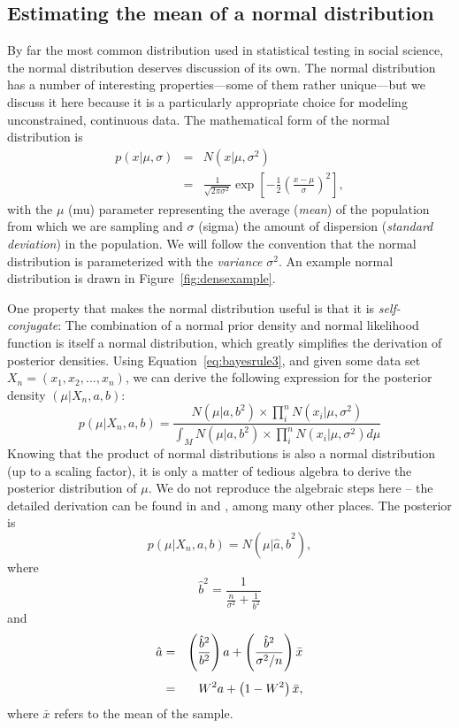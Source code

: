 \subsection*{Estimating the mean of a normal distribution}
By far the most common distribution used in statistical testing in social science, the normal distribution deserves discussion of its own. The normal distribution has a number of interesting properties---some of them rather unique---but we discuss it here because it is a particularly appropriate choice for modeling unconstrained, continuous data.  The mathematical form of the normal distribution is
\begin{eqnarray*}
 p(x|\mu,\sigma) &=& N(x|\mu,\sigma^2) \\
                 &=&\frac{1}{\sqrt{2\pi\sigma^2}}\exp\left[-\frac{1}{2}\left(\frac{x-\mu}{\sigma}\right)^2\right],
\end{eqnarray*}
with the $\mu$ (mu) parameter representing the average (\textit{mean}) of the population from which we are sampling and $\sigma$ (sigma) the amount of dispersion (\textit{standard deviation}) in the population. We will follow the convention that the normal distribution is parameterized with the \textit{variance} $\sigma^2$. An example normal distribution is drawn in Figure~\ref{fig:densexample}.

One property that makes the normal distribution useful is that it is \emph{self-conjugate}: The combination of a normal prior density and normal likelihood function is itself a normal distribution, which greatly simplifies the derivation of posterior densities. Using Equation~\ref{eq:bayesrule3}, and given some data set $X_n=(x_1,x_2,...,x_{n})$, we can derive the following expression for the posterior density $(\mu|X_n,a,b)$: $$p(\mu|X_n,a,b) = \dfrac{N(\mu|a,b^2)\times\prod_i^n N(x_i|\mu,\sigma^2)}{\int_{M}N(\mu|a,b^2)\times\prod_i^n N(x_i|\mu,\sigma^2)d\mu}$$ Knowing that the product of normal distributions is also a normal distribution (up to a scaling factor), it is only a matter of tedious algebra to derive the posterior distribution of $\mu$. We do not reproduce the algebraic steps here -- the detailed derivation can be found in  {and }, among many other places. The posterior is $$p(\mu|X_n,a,b) = N\left(\mu|\hat{a},\hat{b}^2\right),$$ where $$\hat{b}^2 = {\frac{1}{\frac{n}{\sigma^2}+\frac{1}{b^2}}}$$ and 
\begin{eqnarray*}
 \hat{a} &=& \left( \frac{\hat{b}^2}{b^2}\right)a
            +\left( \frac{\hat{b}^2}{\sigma^2/n} \right) \bar x\\[1ex]
         &=& W^2 a + \left(1-W^2\right)\bar x,
\end{eqnarray*}
where $\bar{x}$ refers to the mean of the sample.

